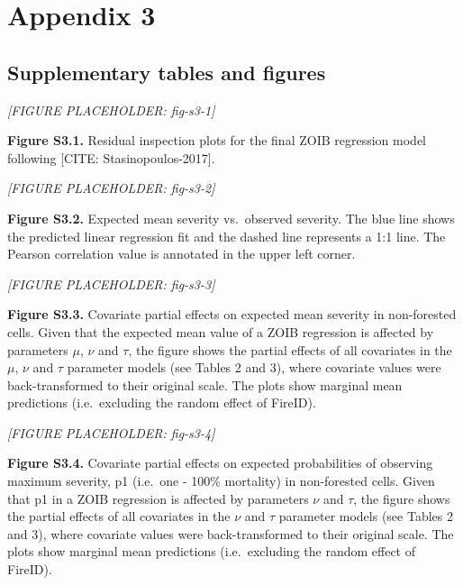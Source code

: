 \documentclass[
  numafflabel,
  authoryear,
  preprint]{elsarticle}
\begin{document}
\newpage{}

\section{Appendix 3}\label{appendix-3}

\subsection{Supplementary tables and
figures}\label{supplementary-tables-and-figures}

\newpage{}

\emph{{[}FIGURE PLACEHOLDER: fig-s3-1{]}}

\textbf{Figure S3.1.} Residual inspection plots for the final ZOIB
regression model following {[}CITE: Stasinopoulos-2017{]}.

\newpage{}

\emph{{[}FIGURE PLACEHOLDER: fig-s3-2{]}}

\textbf{Figure S3.2.} Expected mean severity vs.~observed severity. The
blue line shows the predicted linear regression fit and the dashed line
represents a 1:1 line. The Pearson correlation value is annotated in the
upper left corner.

\newpage{}

\emph{{[}FIGURE PLACEHOLDER: fig-s3-3{]}}

\textbf{Figure S3.3.} Covariate partial effects on expected mean
severity in non-forested cells. Given that the expected mean value of a
ZOIB regression is affected by parameters \(\mu\), \(\nu\) and \(\tau\),
the figure shows the partial effects of all covariates in the \(\mu\),
\(\nu\) and \(\tau\) parameter models (see Tables 2 and 3), where
covariate values were back-transformed to their original scale. The
plots show marginal mean predictions (i.e.~excluding the random effect
of FireID).

\newpage{}

\emph{{[}FIGURE PLACEHOLDER: fig-s3-4{]}}

\textbf{Figure S3.4.} Covariate partial effects on expected
probabilities of observing maximum severity, p1 (i.e.~one - 100\%
mortality) in non-forested cells. Given that p1 in a ZOIB regression is
affected by parameters \(\nu\) and \(\tau\), the figure shows the
partial effects of all covariates in the \(\nu\) and \(\tau\) parameter
models (see Tables 2 and 3), where covariate values were
back-transformed to their original scale. The plots show marginal mean
predictions (i.e.~excluding the random effect of FireID).
\end{document}

